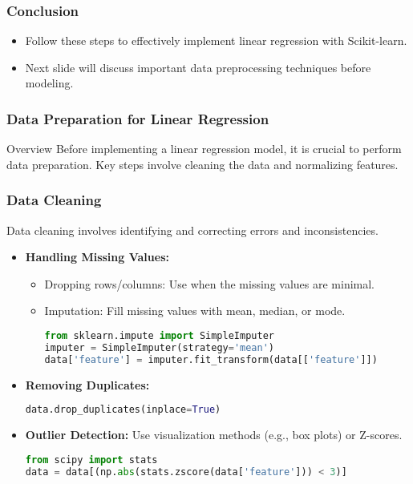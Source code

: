 \documentclass[aspectratio=169]{beamer}
\begin{document}
\begin{frame}[fragile]
    \frametitle{Conclusion}
    \begin{itemize}
        \item Follow these steps to effectively implement linear regression with Scikit-learn.
        \item Next slide will discuss important data preprocessing techniques before modeling.
    \end{itemize}
\end{frame}

\begin{frame}[fragile]
    \frametitle{Data Preparation for Linear Regression}
    \begin{block}{Overview}
        Before implementing a linear regression model, it is crucial to perform data preparation. 
        Key steps involve cleaning the data and normalizing features.
    \end{block}
\end{frame}

\begin{frame}[fragile]
    \frametitle{Data Cleaning}
    Data cleaning involves identifying and correcting errors and inconsistencies.

    \begin{itemize}
        \item \textbf{Handling Missing Values:}
        \begin{itemize}
            \item Dropping rows/columns: Use when the missing values are minimal.
            \item Imputation: Fill missing values with mean, median, or mode.
            \begin{lstlisting}[language=Python]
from sklearn.impute import SimpleImputer
imputer = SimpleImputer(strategy='mean')
data['feature'] = imputer.fit_transform(data[['feature']])
            \end{lstlisting}
        \end{itemize}

        \item \textbf{Removing Duplicates:}
        \begin{lstlisting}[language=Python]
data.drop_duplicates(inplace=True)
        \end{lstlisting}
        
        \item \textbf{Outlier Detection:}
        Use visualization methods (e.g., box plots) or Z-scores.
        \begin{lstlisting}[language=Python]
from scipy import stats
data = data[(np.abs(stats.zscore(data['feature'])) < 3)]
        \end{lstlisting}
    \end{itemize}
\end{frame}
\end{document}
